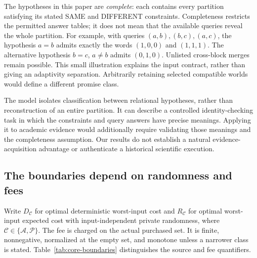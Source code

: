 \documentclass[pdflatex,sn-mathphys-num]{sn-jnl}
\theoremstyle{thmstyleone}
\theoremstyle{thmstylethree}
\theoremstyle{thmstyletwo}
\begin{document}
The hypotheses in this paper are \emph{complete}: each contains every
partition satisfying its stated SAME and DIFFERENT constraints. Completeness
restricts the permitted answer tables; it does not mean that the available
queries reveal the whole partition. For example, with queries
$(a,b),(b,c),(a,c)$, the hypothesis $a=b$ admits exactly the words
$(1,0,0)$ and $(1,1,1)$. The alternative hypothesis $b=c$, $a\ne b$
admits $(0,1,0)$. Unlisted cross-block merges remain possible.
This small illustration explains the input contract, rather than giving
an adaptivity separation. Arbitrarily retaining selected compatible worlds
would define a different promise class.

The model isolates classification between relational hypotheses, rather
than reconstruction of an entire partition. It can describe a controlled
identity-checking task in which the constraints and query answers have
precise meanings. Applying it to academic evidence would additionally
require validating those meanings and the completeness assumption. Our
results do not establish a natural evidence-acquisition advantage or
authenticate a historical scientific execution.

\subsection{The boundaries depend on randomness and fees}
Write $D_{\mathcal C}$ for optimal deterministic worst-input cost and
$R_{\mathcal C}$ for optimal worst-input expected cost with input-independent
private randomness, where $\mathcal C\in\{\mathcal A,\mathcal P\}$.
The fee is charged on the actual purchased set. It is finite, nonnegative,
normalized at the empty set, and monotone unless a narrower class is stated.
Table~\ref{tab:core-boundaries} distinguishes the source and fee quantifiers.
\end{document}
